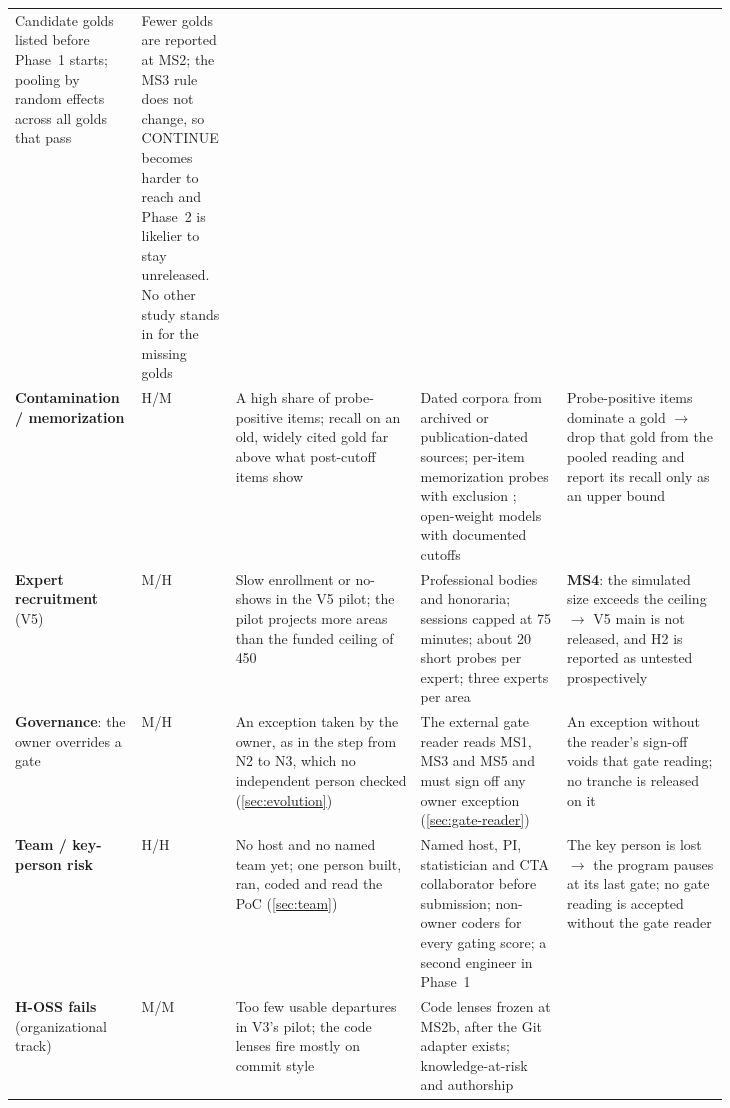 \begin{longtable}{@{}p{0.14\linewidth}p{0.05\linewidth}p{0.24\linewidth}p{0.19\linewidth}p{0.21\linewidth}@{}}
      Candidate golds listed before Phase~1 starts; pooling by random effects across all golds
      that pass &
      Fewer golds are reported at MS2; the MS3 rule does not change, so CONTINUE becomes harder
      to reach and Phase~2 is likelier to stay unreleased. No other study stands in for the
      missing golds \\
    \textbf{Contamination / memorization} &
      H/M &
      A high share of probe-positive items; recall on an old, widely cited gold far above what
      post-cutoff items show &
      Dated corpora from archived or publication-dated sources; per-item memorization probes with
      exclusion \parencite{golchin2023time,sainz2023nlp}; open-weight models with documented
      cutoffs &
      Probe-positive items dominate a gold \(\to\) drop that gold from the pooled reading and
      report its recall only as an upper bound \\
    \textbf{Expert recruitment} (V5) &
      M/H &
      Slow enrollment or no-shows in the V5 pilot; the pilot projects more areas than the funded ceiling
      of 450 &
      Professional bodies and honoraria; sessions capped at 75 minutes; about 20 short probes per
      expert; three experts per area &
      \textbf{MS4}: the simulated size exceeds the ceiling \(\to\) V5 main is not released, and
      H2 is reported as untested prospectively \\
    \textbf{Governance}: the owner overrides a gate &
      M/H &
      An exception taken by the owner, as in the step from N2 to N3, which no independent person
      checked (\cref{sec:evolution}) &
      The external gate reader reads MS1, MS3 and MS5 and must sign off any owner exception
      (\cref{sec:gate-reader}) &
      An exception without the reader's sign-off voids that gate reading; no tranche is released
      on it \\
    \textbf{Team / key-person risk} &
      H/H &
      No host and no named team yet; one person built, ran, coded and read the PoC
      (\cref{sec:team}) &
      Named host, PI, statistician and CTA collaborator before submission; non-owner coders for
      every gating score; a second engineer in Phase~1 &
      The key person is lost \(\to\) the program pauses at its last gate; no gate reading is
      accepted without the gate reader \\
    \textbf{H-OSS fails} (organizational track) &
      M/M &
      Too few usable departures in V3's pilot; the code lenses fire mostly on commit style &
      Code lenses frozen at MS2b, after the Git adapter exists; knowledge-at-risk and authorship

\end{longtable}
